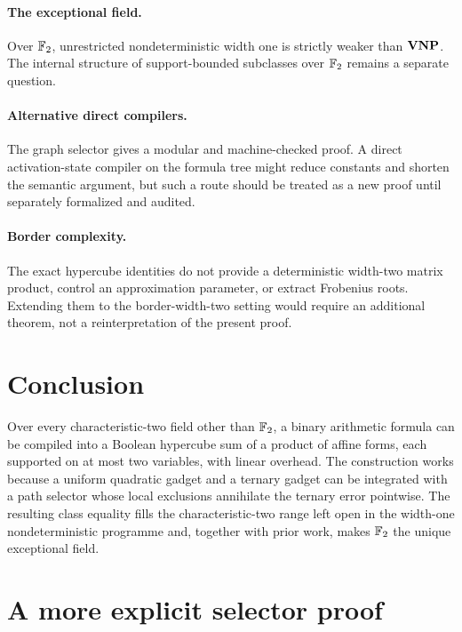 \paragraph{The exceptional field.}
Over \(\mathbb{F}_2\), unrestricted nondeterministic width one is strictly weaker than \(\mathbf{VNP}\).
The internal structure of support-bounded subclasses over \(\mathbb{F}_2\) remains a separate
question.

\paragraph{Alternative direct compilers.}
The graph selector gives a modular and machine-checked proof.  A direct activation-state
compiler on the formula tree might reduce constants and shorten the semantic argument, but
such a route should be treated as a new proof until separately formalized and audited.

\paragraph{Border complexity.}
The exact hypercube identities do not provide a deterministic width-two matrix product,
control an approximation parameter, or extract Frobenius roots.  Extending them to the
border-width-two setting would require an additional theorem, not a reinterpretation of
the present proof.

\section{Conclusion}

Over every characteristic-two field other than \(\mathbb{F}_2\), a binary arithmetic formula can
be compiled into a Boolean hypercube sum of a product of affine forms, each supported on at
most two variables, with linear overhead.  The construction works because a uniform
quadratic gadget and a ternary gadget can be integrated with a path selector whose local
exclusions annihilate the ternary error pointwise.  The resulting class equality fills the
characteristic-two range left open in the width-one nondeterministic programme and, together
with prior work, makes \(\mathbb{F}_2\) the unique exceptional field.

\appendix

\section{A more explicit selector proof}\label{app:selector}

